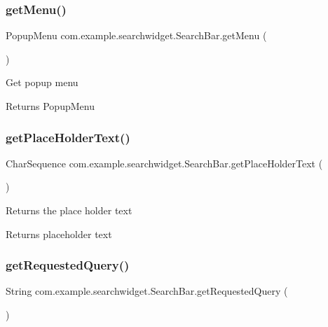 \subsubsection{\texorpdfstring{getMenu()}{getMenu()}}
{\footnotesize\ttfamily Popup\+Menu com.\+example.\+searchwidget.\+Search\+Bar.\+get\+Menu (\begin{DoxyParamCaption}{ }\end{DoxyParamCaption})}

Get popup menu

\begin{DoxyReturn}{Returns}
Popup\+Menu 
\end{DoxyReturn}
\mbox{\label{classcom_1_1example_1_1searchwidget_1_1_search_bar_a97ca29bf8c1fe951bec0dee054187108}} 
\subsubsection{\texorpdfstring{getPlaceHolderText()}{getPlaceHolderText()}}
{\footnotesize\ttfamily Char\+Sequence com.\+example.\+searchwidget.\+Search\+Bar.\+get\+Place\+Holder\+Text (\begin{DoxyParamCaption}{ }\end{DoxyParamCaption})}

Returns the place holder text

\begin{DoxyReturn}{Returns}
placeholder text 
\end{DoxyReturn}
\mbox{\label{classcom_1_1example_1_1searchwidget_1_1_search_bar_a4e9189e7948cfa925689c3aea179b3a5}} 
\subsubsection{\texorpdfstring{getRequestedQuery()}{getRequestedQuery()}}
{\footnotesize\ttfamily String com.\+example.\+searchwidget.\+Search\+Bar.\+get\+Requested\+Query (\begin{DoxyParamCaption}{ }\end{DoxyParamCaption})}

